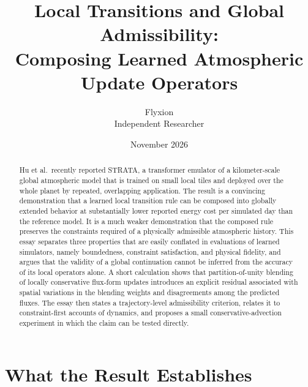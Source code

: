 \documentclass[11pt]{article}
\title{Local Transitions and Global Admissibility:\\
Composing Learned Atmospheric Update Operators}
\author{Flyxion\\Independent Researcher}
\date{November 2026}
\theoremstyle{definition}
\theoremstyle{remark}
\begin{document}
\maketitle

\begin{abstract}
\noindent Hu et al.\ recently reported STRATA, a transformer emulator of a kilometer-scale global atmospheric model that is trained on small local tiles and deployed over the whole planet by repeated, overlapping application. The result is a convincing demonstration that a learned local transition rule can be composed into globally extended behavior at substantially lower reported energy cost per simulated day than the reference model. It is a much weaker demonstration that the composed rule preserves the constraints required of a physically admissible atmospheric history. This essay separates three properties that are easily conflated in evaluations of learned simulators, namely boundedness, constraint satisfaction, and physical fidelity, and argues that the validity of a global continuation cannot be inferred from the accuracy of its local operators alone. A short calculation shows that partition-of-unity blending of locally conservative flux-form updates introduces an explicit residual associated with spatial variations in the blending weights and disagreements among the predicted fluxes. The essay then states a trajectory-level admissibility criterion, relates it to constraint-first accounts of dynamics, and proposes a small conservative-advection experiment in which the claim can be tested directly.
\end{abstract}

\section{What the Result Establishes}
\end{document}
